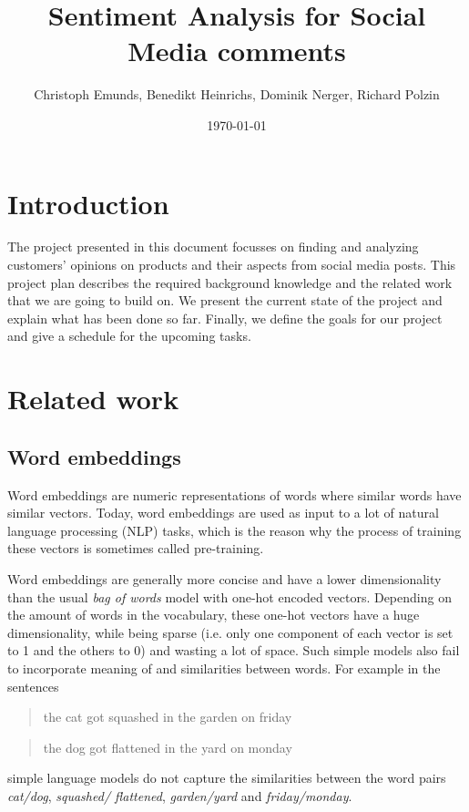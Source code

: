 \documentclass[10pt,a4paper]{article}
\title{{\Huge Sentiment Analysis for Social Media comments}}
\author{Christoph Emunds, Benedikt Heinrichs, Dominik Nerger, Richard Polzin}
\date{\today}
\begin{document}
	\maketitle
	
	\begin{abstract}
		
	\end{abstract}
	
	\section{Introduction}
	The project presented in this document focusses on finding and analyzing customers' opinions on products and their aspects from social media posts. This project plan describes the required background knowledge and the related work that we are going to build on. We present the current state of the project and explain what has been done so far. Finally, we define the goals for our project and give a schedule for the upcoming tasks.
	
	\section{Related work}
	
		\subsection{Word embeddings}
		Word embeddings are numeric representations of words where similar words have similar vectors. Today, word embeddings are used as input to a lot of natural language processing (NLP) tasks, which is the reason why the process of training these vectors is sometimes called pre-training.
		
		Word embeddings are generally more concise and have a lower dimensionality than the usual \textit{bag of words} model with one-hot encoded vectors. Depending on the amount of words in the vocabulary, these one-hot vectors have a huge dimensionality, while being sparse (i.e. only one component of each vector is set to 1 and the others to 0) and wasting a lot of space. Such simple models also fail to incorporate meaning of and similarities between words. For example in the sentences
		\begin{quote}
			the cat got squashed in the garden on friday
		\end{quote}
		\begin{quote}
			the dog got flattened in the yard on monday
		\end{quote}
		simple language models do not capture the similarities between the word pairs \textit{cat/dog}, \textit{squashed/ flattened}, \textit{garden/yard} and \textit{friday/monday}.
		
\end{document}
